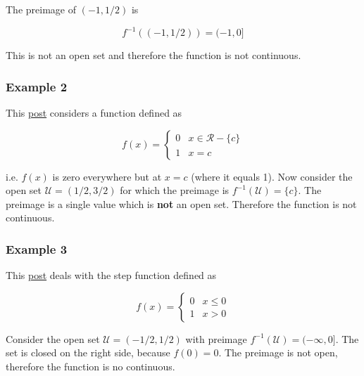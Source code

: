 The preimage of \((-1,1/2)\) is

\[
f^{-1}((-1,1/2)) = (-1,0]
\]

This is not an open set and therefore the function is not continuous.

\subsubsection{Example 2}

This
\href{http://math.stackexchange.com/questions/287574/proving-continuity-using-the-topological-definition}{post}
considers a function defined as

\[
f(x) = \begin{cases}
0 & x \in \mathcal{R} - \{c\} \\
1 & x = c \end{cases}
\]

i.e. \(f(x)\) is zero everywhere but at \(x=c\) (where it equals 1). Now
consider the open set \(\mathcal{U} = (1/2, 3/2)\) for which the
preimage is \(f^{-1}(\mathcal{U}) = \{c\}\). The preimage is a single
value which is \textbf{not} an open set. Therefore the function is not
continuous.

\subsubsection{Example 3}

This
\href{http://math.stackexchange.com/questions/1340774/intuition-on-the-topological-definition-of-continuity-considering-the-special-c}{post}
deals with the step function defined as

\[
f(x) = \begin{cases}
0 & x \leq 0 \\
1 & x > 0 \end{cases}
\]

Consider the open set \(\mathcal{U} = (-1/2, 1/2)\) with preimage
\(f^{-1}(\mathcal{U}) = (- \infty, 0]\). The set is closed on the right
side, because \(f(0) = 0\). The preimage is not open, therefore the
function is no continuous.
